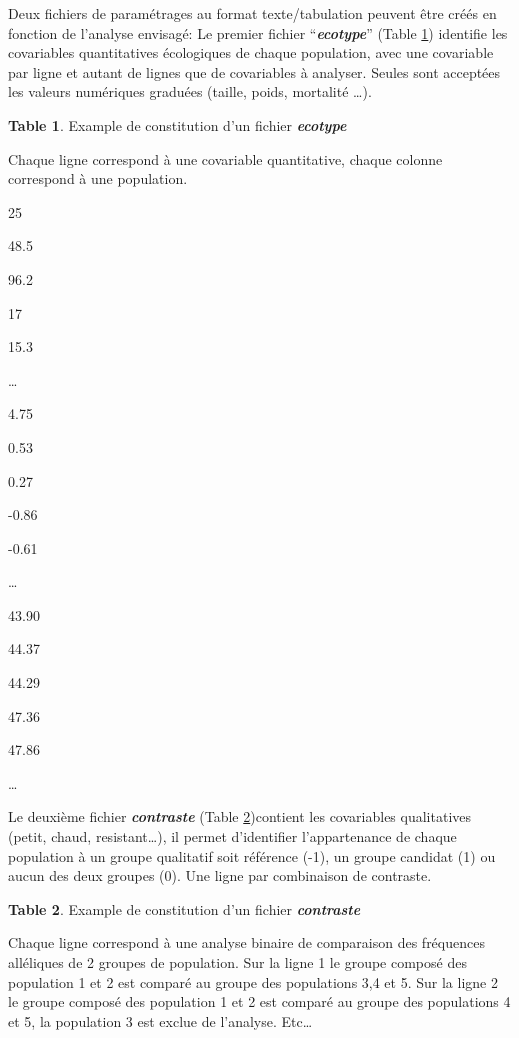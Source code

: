 \documentclass[
  openany]{book}
\theoremstyle{definition}
\newtheorem{definition}{Table}[chapter]
\theoremstyle{definition}
\theoremstyle{definition}
\theoremstyle{definition}
\theoremstyle{remark}
\begin{document}
Deux fichiers de paramétrages au format texte/tabulation peuvent être créés en fonction de l'analyse envisagé:
Le premier fichier ``\textbf{\emph{ecotype}}'' (Table \ref{def:table1}) identifie les covariables quantitatives écologiques de chaque population, avec une covariable par ligne et autant de lignes que de covariables à analyser. Seules sont acceptées les valeurs numériques graduées (taille, poids, mortalité \ldots).

\begin{definition}
\protect\hypertarget{def:table1}{}\label{def:table1}{Example de constitution d'un fichier \textbf{\emph{ecotype}}}
\end{definition}

Chaque ligne correspond à une covariable quantitative, chaque colonne correspond à une population.

25

48.5

96.2

17

15.3

\ldots{}

4.75

0.53

0.27

-0.86

-0.61

\ldots{}

43.90

44.37

44.29

47.36

47.86

\ldots{}

Le deuxième fichier \textbf{\emph{contraste}} (Table \ref{def:table2})contient les covariables qualitatives (petit, chaud, resistant\ldots), il permet d'identifier l'appartenance de chaque population à un groupe qualitatif soit référence (-1), un groupe candidat (1) ou aucun des deux groupes (0). Une ligne par combinaison de contraste.

\begin{definition}
\protect\hypertarget{def:table2}{}\label{def:table2}{Example de constitution d'un fichier \textbf{\emph{contraste}}}
\end{definition}

Chaque ligne correspond à une analyse binaire de comparaison des fréquences alléliques de 2 groupes de population.
Sur la ligne 1 le groupe composé des population 1 et 2 est comparé au groupe des populations 3,4 et 5.
Sur la ligne 2 le groupe composé des population 1 et 2 est comparé au groupe des populations 4 et 5, la population 3 est exclue de l'analyse.
Etc\ldots{}
\end{document}
